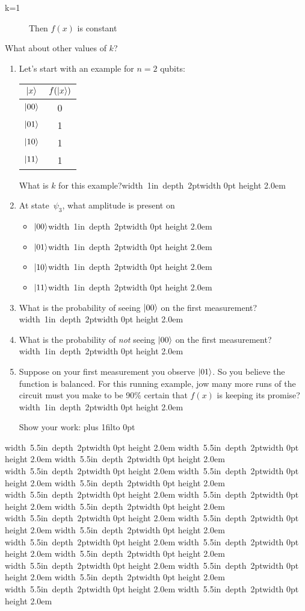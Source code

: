 \documentclass[12pt]{article}
\newcommand{\Blank}{\mbox{\hskip 4pt\vrule width 1in depth 2pt}\vrule width 0pt height 2.0em}
\newcommand{\BlankLine}{\mbox{\hskip 4pt\vrule width 5.5in depth 2pt}\vrule width 0pt height 2.0em}
\def\DefaultSpace{1in}
\newcommand{\LeaveSpace}[1][\DefaultSpace]{%
\vskip #1 plus 1fil\relax\hbox to 0pt{\hss} %
}
\begin{document}
\begin{enumerate}[font=\bfseries]
\begin{description}
         \item[k=1] Then $f(x)$ is constant
     \end{description}
     What about other values of $k$?
    \begin{enumerate}
        \item Let's start with an example for $n = 2$ qubits:
        \begin{center}
            \begin{tabular}{c|c}
                 $\ket{x}$&$f(\ket{x})$  \\\hline
                 $\ket{00}$ & 0 \\
                 $\ket{01}$ & 1 \\
                 $\ket{10}$ & 1 \\
                 $\ket{11}$ & 1 \\
            \end{tabular}
        \end{center}
        What is $k$ for this example?\Blank{}
        \item At state~$\psi_{3}$, what amplitude is present on
        \begin{itemize}
            \item $\ket{00}$\Blank{}
             \item $\ket{01}$\Blank{}
              \item $\ket{10}$\Blank{}
               \item $\ket{11}$\Blank{}
        \end{itemize}
        \item What is the probability of seeing $\ket{00}$ on the first measurement?\Blank{}
        \item What is the probability of \emph{not} seeing $\ket{00}$ on the first measurement?\Blank{}
        \item Suppose on your first measurement you observe $\ket{01}$.  So you believe the function is balanced.  For this running example, jow many more runs of the circuit must you make to be 90\% certain that $f(x)$ is keeping its promise? \Blank{}
        
        Show your work:
        \LeaveSpace{}
    \end{enumerate}

\end{enumerate}
\newpage
\noindent \BlankLine{}
\BlankLine{}
\BlankLine{}
\BlankLine{}
\BlankLine{}
\BlankLine{}
\BlankLine{}
\BlankLine{}
\BlankLine{}
\BlankLine{}
\BlankLine{}
\BlankLine{}
\BlankLine{}
\BlankLine{}
\BlankLine{}
\BlankLine{}
\BlankLine{}
\BlankLine{}
\BlankLine{}
\BlankLine{}
\end{document}
